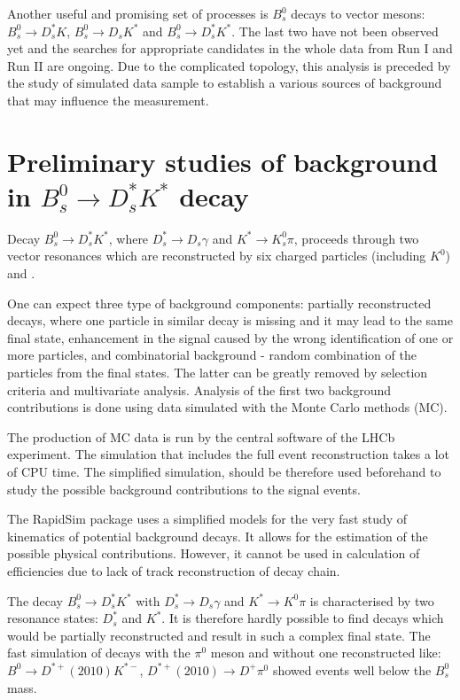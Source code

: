 \documentclass{appolb}
\begin{document}
Another useful and promising set of processes is $B^0_s$ decays to vector mesons: $B^0_s \rightarrow D_s^* K$,  $B^0_s \rightarrow D_s K^*$ and $B^0_s \rightarrow D_s^* K^*$. The last two have not been observed yet and the searches for appropriate candidates in the whole data from Run I and Run II are ongoing. Due to the complicated topology, this analysis is preceded by the study of simulated data sample to establish a various sources of background that may influence the measurement.


\section{Preliminary studies of background in $B^0_s \rightarrow D_s^* K^*$ decay}

Decay $B^0_s \rightarrow D_s^* K^*$, where $D^*_s\rightarrow D_s \gamma$ and $K^*\rightarrow K^0_s \pi$, proceeds through two vector resonances which are reconstructed by six charged particles (including $K^0$) and \g. 

 One can expect three type of background components: partially reconstructed decays, where one particle in similar decay is missing and it may lead to the same final state, enhancement in the signal caused by the wrong identification of one or more particles, and combinatorial background - random combination of the particles from the final states. 
 The latter can be greatly removed by selection criteria and multivariate analysis. Analysis of the first two background contributions is done using data simulated with the Monte Carlo methods (MC).

The production of MC data is run by the central software of the LHCb experiment. The simulation that includes the full event reconstruction takes a lot of CPU time. The simplified simulation, should be therefore used beforehand to study the possible background contributions to the signal events.

The RapidSim package \cite{rapidsim} uses a simplified models for the very fast study of kinematics of potential background decays. It allows for the estimation of the possible physical contributions. However, it cannot be used in calculation of efficiencies due to lack of track reconstruction of decay chain. 

The decay $B^0_s \rightarrow D_s^* K^*$ with $D_s^*\rightarrow D_s \gamma$ and $K^*\rightarrow K^0 \pi$ is characterised by two resonance states: $D_s^*$ and $K^*$. It is therefore hardly possible to find  decays which would be partially reconstructed and result in such a complex final state. The fast simulation of decays with the $\pi^0$ meson and without one \g reconstructed like: $B^0 \rightarrow D^{*+}(2010) K^{*-}$, $D^{*+}(2010)\rightarrow D^+ \pi^0$ showed events well below the $B^0_s$ mass.
\end{document}
